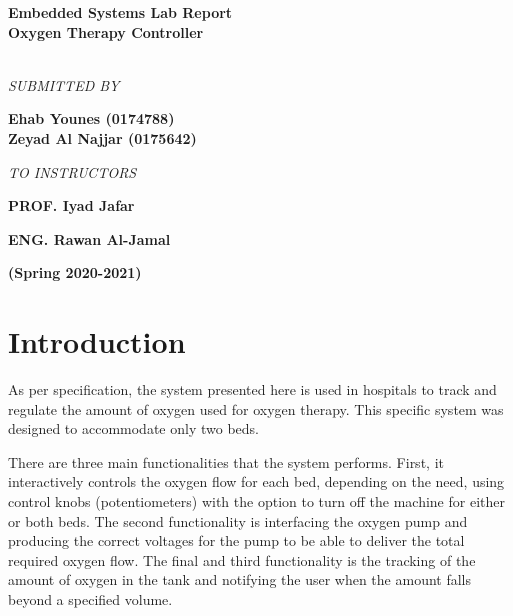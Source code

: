 \documentclass[a4paper, 12pt]{article}
\begin{document}
\begin{frontmatter}
\begin{titlepage}
\begin{center}
\begin{LARGE}
{\textbf {Embedded Systems Lab Report\\[0.5cm] Oxygen Therapy Controller}}\end{LARGE}\\[1cm]
\textit{SUBMITTED BY}\\[0.3cm]
\begin{large}
\textbf{Ehab Younes (0174788)}\\[0.1cm]
\textbf{Zeyad Al Najjar (0175642)}\\[1cm]
\end{large}
\textit{TO INSTRUCTORS}\\[0.3cm]
\begin{large}\textbf{PROF. Iyad Jafar}\\[0.3cm]\end{large}
\begin{large}\textbf{ENG. Rawan Al-Jamal}\\[0.3cm]\end{large}
\textbf{(Spring 2020-2021)}
\vfill
\end{center}
\end{titlepage}

\setcounter{page}{1}
\newpage
\tableofcontents
\end{frontmatter}

\newpage
{}
\section{Introduction}
As per specification, the system presented here is used in hospitals to track and regulate the amount of oxygen used for oxygen therapy. This specific system was designed to accommodate only two beds. \\

\par There are three main functionalities that the system performs. First, it interactively controls the oxygen flow for each bed, depending on the need, using control knobs (potentiometers) with the option to turn off the machine for either or both beds. The second functionality is interfacing the oxygen pump and producing the correct voltages for the pump to be able to deliver the total required oxygen flow. The final and third functionality is the tracking of the amount of oxygen in the tank and notifying the user when the amount falls beyond a specified volume. \\
\end{document}
